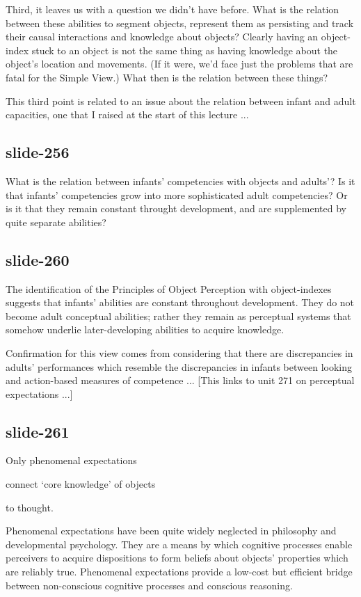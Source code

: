 \documentclass[12pt,\papersize]{extarticle}
\begin{document}
Third, it leaves us with a question we didn't have before.
What is the relation between these abilities to segment objects, represent them as persisting
and track their causal interactions and knowledge about objects?
Clearly having an object-index stuck to an object is not the same thing as having knowledge
about the object's location and movements.  (If it were, we'd face just the problems that are
fatal for the Simple View.)
What then is the relation between these things?

This third point is related to an issue about the relation between infant and adult capacities,
one that  I raised at the start of this lecture ...

\subsection{slide-256}
What is the relation between infants' competencies with objects and adults'?
Is it that infants' competencies grow into more sophisticated adult competencies?
Or is it that they remain constant throught development, and are supplemented by quite
separate abilities?

\subsection{slide-260}
The identification of the Principles of Object Perception with object-indexes suggests that
infants' abilities are constant throughout development.
They do not become adult conceptual abilities; rather they remain as perceptual systems
that somehow underlie later-developing abilities to acquire knowledge.

Confirmation for this view comes from considering that there are discrepancies in adults'
performances which resemble the discrepancies in infants between looking and action-based
measures of competence ...
[This links to unit 271 on perceptual expectations ...]

\subsection{slide-261}
Only phenomenal expectations



connect ‘core knowledge’ of objects



to thought.


Phenomenal expectations have been quite widely neglected in philosophy and
developmental psychology.
They are a means by which cognitive processes enable perceivers to
acquire dispositions to form beliefs about objects’ properties which are
reliably true.
Phenomenal expectations provide a low-cost but efficient bridge between
non-conscious cognitive processes and conscious reasoning.
\end{document}
